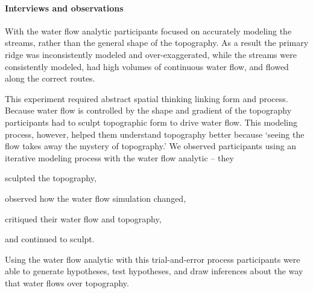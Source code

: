 \documentclass[prodmode,acmtochi]{acmsmall} %
\begin{document}
\paragraph{Interviews and observations}
With the water flow analytic
participants focused on accurately modeling the streams, 
rather than the general shape of the topography. 
As a result the primary ridge was inconsistently modeled and over-exaggerated,
while the streams were consistently modeled,
had high volumes of continuous water flow, 
and flowed along the correct routes.

This experiment required abstract spatial thinking linking form and process. 
Because water flow is controlled by the shape and gradient of the topography
participants had to sculpt topographic form to drive water flow. 
This modeling process, however, helped them understand topography better 
because `seeing the flow takes away the mystery of topography.' 
%
We observed participants using an iterative modeling process 
with the water flow analytic -- 
they 
\begin{enumerate*}[label=\alph*),font=\itshape]
\item sculpted the topography, 
\item observed how the water flow simulation changed, 
\item critiqued their water flow and topography, 
\item and continued to sculpt.
\end{enumerate*}
%
Using the water flow analytic with this trial-and-error process
participants were able to generate hypotheses, test hypotheses, and draw inferences 
about the way that water flows over topography. 
%

\end{document}
